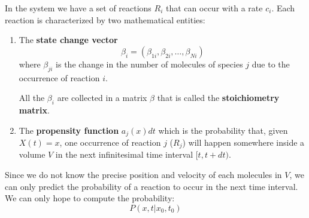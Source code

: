 In the system we have a set of reactions $R_i$ that can occur with a rate $c_i$.
Each reaction is characterized by two mathematical entities:
\begin{enumerate}
    \item The \textbf{state change vector}
          \begin{equation*}
              \beta_i = \left( \beta_{1i}, \beta_{2i}, \ldots, \beta_{Ni} \right)
          \end{equation*}
          where $\beta_{ji}$ is the change in the number of molecules of species
          $j$ due to the occurrence of reaction $i$.

          All the $\beta_i$ are collected in a matrix $\beta$ that is called the
          \textbf{stoichiometry matrix}.
    \item The \textbf{propensity function} $a_j(x)dt$ which is the probability
          that, given $X(t) = x$, one occurrence of reaction $j$ ($R_j$) will
          happen somewhere inside a volume $V$ in the next infinitesimal time
          interval $[t, t + dt)$.
\end{enumerate}

Since we do not know the precise position and velocity of each molecules in $V$,
we can only predict the probability of a reaction to occur in the next time
interval. We can only hope to compute the probability:
\begin{equation}
    P(x, t| x_0, t_0)
\end{equation}

